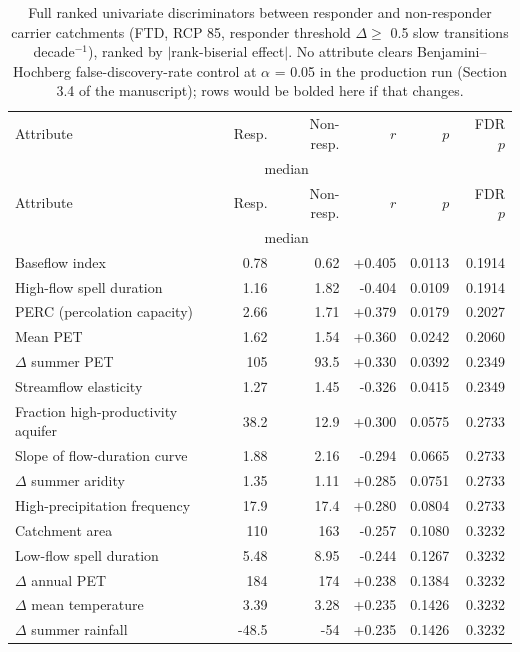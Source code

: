\begin{center}
\small
\setlength{\tabcolsep}{4pt}
\begin{longtable}{p{5.2cm} r r r r r}
\caption{Full ranked univariate discriminators between responder and non-responder carrier catchments (FTD, RCP 85, responder threshold $\Delta \geq$ 0.5 slow transitions decade$^{-1}$), ranked by $|$rank-biserial effect$|$. No attribute clears Benjamini--Hochberg false-discovery-rate control at $\alpha$ = 0.05 in the production run (Section 3.4 of the manuscript); rows would be bolded here if that changes.} \label{tab:S3} \\
\hline
Attribute & Resp. & Non-resp. & $r$ & $p$ & FDR $p$ \\
& \multicolumn{2}{c}{median} & & & \\
\hline
\endfirsthead
\hline
Attribute & Resp. & Non-resp. & $r$ & $p$ & FDR $p$ \\
& \multicolumn{2}{c}{median} & & & \\
\hline
\endhead
\hline
\endfoot
Baseflow index & 0.78 & 0.62 & +0.405 & 0.0113 & 0.1914 \\
High-flow spell duration & 1.16 & 1.82 & -0.404 & 0.0109 & 0.1914 \\
PERC (percolation capacity) & 2.66 & 1.71 & +0.379 & 0.0179 & 0.2027 \\
Mean PET & 1.62 & 1.54 & +0.360 & 0.0242 & 0.2060 \\
$\Delta$ summer PET & 105 & 93.5 & +0.330 & 0.0392 & 0.2349 \\
Streamflow elasticity & 1.27 & 1.45 & -0.326 & 0.0415 & 0.2349 \\
Fraction high-productivity aquifer & 38.2 & 12.9 & +0.300 & 0.0575 & 0.2733 \\
Slope of flow-duration curve & 1.88 & 2.16 & -0.294 & 0.0665 & 0.2733 \\
$\Delta$ summer aridity & 1.35 & 1.11 & +0.285 & 0.0751 & 0.2733 \\
High-precipitation frequency & 17.9 & 17.4 & +0.280 & 0.0804 & 0.2733 \\
Catchment area & 110 & 163 & -0.257 & 0.1080 & 0.3232 \\
Low-flow spell duration & 5.48 & 8.95 & -0.244 & 0.1267 & 0.3232 \\
$\Delta$ annual PET & 184 & 174 & +0.238 & 0.1384 & 0.3232 \\
$\Delta$ mean temperature & 3.39 & 3.28 & +0.235 & 0.1426 & 0.3232 \\
$\Delta$ summer rainfall & -48.5 & -54 & +0.235 & 0.1426 & 0.3232 \\

\end{longtable}
\end{center}
